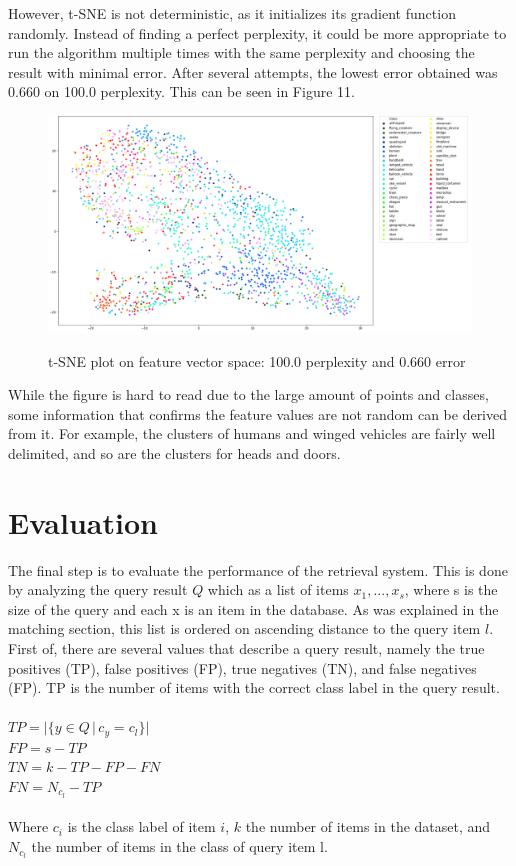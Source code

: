 \documentclass{bigdata}
\begin{document}
However, t-SNE is not deterministic, as it initializes its gradient function randomly. Instead of finding a perfect perplexity, it could be more appropriate to run the algorithm multiple times with the same perplexity and choosing the result with minimal error. After several attempts, the lowest error obtained was 0.660 on 100.0 perplexity. This can be seen in Figure 11. \\
\begin{figure}[!h]
	\includegraphics[width=1\linewidth]{Pictures/perp100err0-660.png}
	\label{fig:fig1}
	\caption{t-SNE plot on feature vector space: 100.0 perplexity and 0.660 error}
\end{figure}

While the figure is hard to read due to the large amount of points and classes, some information that confirms the feature values are not random can be derived from it. For example, the clusters of humans and winged vehicles are fairly well delimited, and so are the clusters for heads and doors.

\section{Evaluation}
The final step is to evaluate the performance of the retrieval system. This is done by analyzing the query result $Q$ which as a list of items ${x_1,...,x_s}$, where s is the size of the query and each x is an item in the database. As was explained in the matching section, this list is ordered on ascending distance to the query item $l$. First of, there are several values that describe a query result, namely the true positives (TP), false positives (FP), true negatives (TN), and false negatives (FP).
TP is the number of items with the correct class label in the query result.\\ 
\\
$TP = |\{y \in Q\, |\, c_y = c_l\}|$\\
$FP = s - TP$\\
$TN = k - TP - FP - FN$\\
$FN = N_{c_l} - TP$\\
\\
Where $c_i$ is the class label of item $i$, $k$ the number of items in the dataset, and $N_{c_l}$ the number of items in the class of query item l. 
\end{document}
